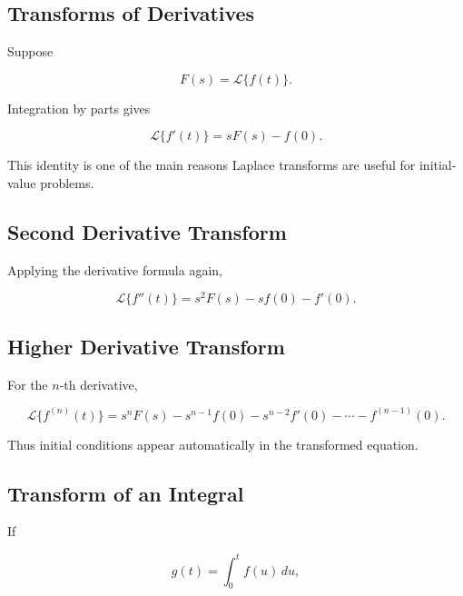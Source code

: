 \subsection{Transforms of Derivatives}
\label{subsec:laplace-derivatives}

Suppose

\[
F(s)
=
\mathcal{L}\{f(t)\}.
\]

Integration by parts gives

\[
\boxed{
\mathcal{L}\{f'(t)\}
=
sF(s)-f(0).
}
\]

This identity is one of the main reasons Laplace transforms are useful for
initial-value problems.

\subsection{Second Derivative Transform}
\label{subsec:laplace-second-derivative}

Applying the derivative formula again,

\[
\boxed{
\mathcal{L}\{f''(t)\}
=
s^2F(s)
-
sf(0)
-
f'(0).
}
\]

\subsection{Higher Derivative Transform}
\label{subsec:laplace-higher-derivatives}

For the \(n\)-th derivative,

\[
\boxed{
\mathcal{L}\{f^{(n)}(t)\}
=
s^nF(s)
-
s^{n-1}f(0)
-
s^{n-2}f'(0)
-
\cdots
-
f^{(n-1)}(0).
}
\]

Thus initial conditions appear automatically in the transformed equation.

\subsection{Transform of an Integral}
\label{subsec:laplace-integral}

If

\[
g(t)
=
\int_0^t
f(u)\,du,
\]

